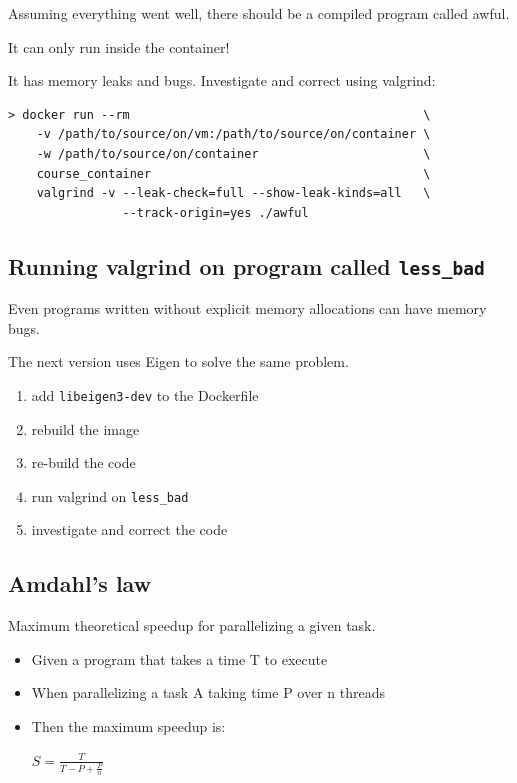 Assuming everything went well, there should be a compiled program called
awful.

It can only run inside the container!

It has memory leaks and bugs. Investigate and correct using valgrind:

\begin{verbatim}
> docker run --rm                                         \
    -v /path/to/source/on/vm:/path/to/source/on/container \
    -w /path/to/source/on/container                       \
    course_container                                      \
    valgrind -v --leak-check=full --show-leak-kinds=all   \
                --track-origin=yes ./awful
\end{verbatim}

\subsection{Running valgrind on program called
\texttt{less\_bad}}\label{running-valgrind-on-program-called-lessux5fbad}

Even programs written without explicit memory allocations can have
memory bugs.

The next version uses Eigen to solve the same problem.

\begin{enumerate}
\def\labelenumi{\arabic{enumi}.}
\itemsep1pt\parskip0pt
\item
  add \texttt{libeigen3-dev} to the Dockerfile
\item
  rebuild the image
\item
  re-build the code
\item
  run valgrind on \texttt{less\_bad}
\item
  investigate and correct the code
\end{enumerate}

\subsection{Amdahl's law}\label{amdahls-law}

Maximum theoretical speedup for parallelizing a given task.

\begin{itemize}
\item
  Given a program that takes a time T to execute
\item
  When parallelizing a task A taking time P over n threads
\item
  Then the maximum speedup is:

  $S = \frac{T}{T - P + \frac{P}{n}}$
\end{itemize}

